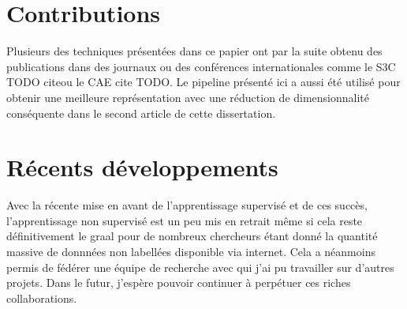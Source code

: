 \section{Contributions}

Plusieurs des techniques pr\'{e}sent\'{e}es dans ce papier ont par la suite obtenu des
publications dans des journaux ou des conf\'{e}rences internationales comme le S3C
TODO citeou le CAE cite TODO. Le pipeline pr\'{e}sent\'{e} ici a aussi \'{e}t\'{e} utilis\'{e} pour
obtenir une meilleure repr\'{e}sentation avec une r\'{e}duction de dimensionnalit\'{e}
cons\'{e}quente dans le second article de cette dissertation. 

\section{R\'{e}cents d\'{e}veloppements}

Avec la r\'{e}cente mise en avant de l'apprentissage supervis\'{e} et de ces succ\`{e}s,
l'apprentissage non supervis\'{e} est un peu mis en retrait m\^{e}me si cela reste
d\'{e}finitivement le graal pour de nombreux chercheurs \'{e}tant donn\'{e}  la quantit\'{e}
massive de donnn\'{e}es non labell\'{e}es disponible via internet. Cela a n\'{e}anmoins
permis de f\'{e}d\'{e}rer une \'{e}quipe de recherche avec qui j'ai pu travailler sur
d'autres projets. Dans le futur, j'esp\`{e}re pouvoir continuer \`{a} perp\'{e}tuer ces riches
collaborations.
